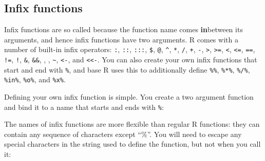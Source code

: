 \documentclass[]{book}
\newenvironment{Shaded}{\begin{snugshade}}{\end{snugshade}}
\newcommand{\KeywordTok}[1]{\textcolor[rgb]{0.13,0.29,0.53}{\textbf{#1}}}
\newcommand{\DataTypeTok}[1]{\textcolor[rgb]{0.13,0.29,0.53}{#1}}
\newcommand{\CharTok}[1]{\textcolor[rgb]{0.31,0.60,0.02}{#1}}
\newcommand{\StringTok}[1]{\textcolor[rgb]{0.31,0.60,0.02}{#1}}
\newcommand{\ControlFlowTok}[1]{\textcolor[rgb]{0.13,0.29,0.53}{\textbf{#1}}}
\newcommand{\OperatorTok}[1]{\textcolor[rgb]{0.81,0.36,0.00}{\textbf{#1}}}
\newcommand{\NormalTok}[1]{#1}
\theoremstyle{definition}
\theoremstyle{definition}
\theoremstyle{definition}
\theoremstyle{remark}
\begin{document}
\hypertarget{infix-functions}{\subsection{Infix
functions}\label{infix-functions}}

Infix functions are so called because the function name comes
\textbf{in}between its arguments, and hence infix functions have two
arguments. R comes with a number of built-in infix operators:
\texttt{:}, \texttt{::}, \texttt{:::}, \texttt{\$}, \texttt{@},
\texttt{\^{}}, \texttt{*}, \texttt{/}, \texttt{+}, \texttt{-},
\texttt{\textgreater{}}, \texttt{\textgreater{}=}, \texttt{\textless{}},
\texttt{\textless{}=}, \texttt{==}, \texttt{!=}, \texttt{!},
\texttt{\&}, \texttt{\&\&}, \texttt{\textbar{}},
\texttt{\textbar{}\textbar{}}, \texttt{\textasciitilde{}},
\texttt{\textless{}-}, and \texttt{\textless{}\textless{}-}. You can
also create your own infix functions that start and end with
\texttt{\%}, and base R uses this to additionally define \texttt{\%\%},
\texttt{\%*\%}, \texttt{\%/\%}, \texttt{\%in\%}, \texttt{\%o\%}, and
\texttt{\%x\%}.

Defining your own infix function is simple. You create a two argument
function and bind it to a name that starts and ends with \texttt{\%}:

\begin{Shaded}
\end{Shaded}

The names of infix functions are more flexible than regular R functions:
they can contain any sequence of characters except ``\%''. You will need
to escape any special characters in the string used to define the
function, but not when you call it:

\begin{Shaded}
\end{Shaded}
\end{document}
